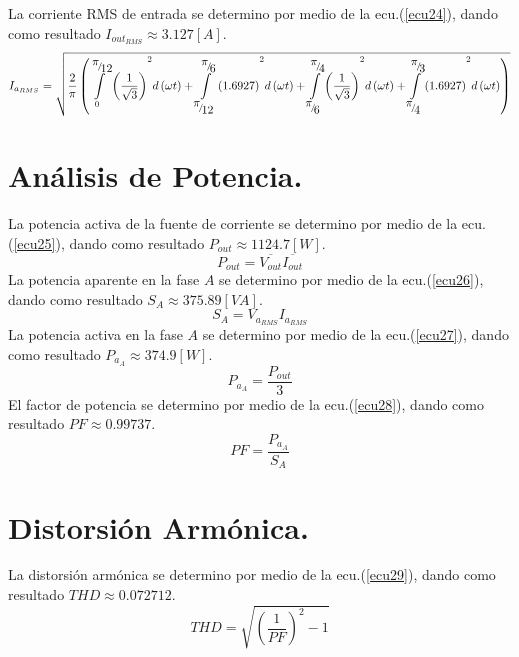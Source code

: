 \documentclass[12pt,graphicx,caption,rotating]{article}
\begin{document}
\noindent
La corriente RMS de entrada se determino por medio de la ecu.(\ref{ecu24}), dando como resultado $I_{out_{RMS}} \approx 3.127 [A] $.
\begin{equation}
 {I_{{a_{RMS}}}} = \sqrt {\frac{2}{\pi }\left( {{{\int\limits_0^{{\raise0.7ex\hbox{$\pi $} \!\mathord{\left/
 {\vphantom {\pi  {12}}}\right.\kern-\nulldelimiterspace}
\!\lower0.7ex\hbox{${12}$}}} {\left( {\frac{1}{{\sqrt 3 }}} \right)} }^2}d\left( {\omega t} \right) + {{\int\limits_{{\raise0.7ex\hbox{$\pi $} \!\mathord{\left/
 {\vphantom {\pi  {12}}}\right.\kern-\nulldelimiterspace}
\!\lower0.7ex\hbox{${12}$}}}^{{\raise0.7ex\hbox{$\pi $} \!\mathord{\left/
 {\vphantom {\pi  6}}\right.\kern-\nulldelimiterspace}
\!\lower0.7ex\hbox{$6$}}} {\left( {1.6927} \right)} }^2}d\left( {\omega t} \right) + {{\int\limits_{{\raise0.7ex\hbox{$\pi $} \!\mathord{\left/
 {\vphantom {\pi  6}}\right.\kern-\nulldelimiterspace}
\!\lower0.7ex\hbox{$6$}}}^{{\raise0.7ex\hbox{$\pi $} \!\mathord{\left/
 {\vphantom {\pi  4}}\right.\kern-\nulldelimiterspace}
\!\lower0.7ex\hbox{$4$}}} {\left( {\frac{1}{{\sqrt 3 }}} \right)} }^2}d\left( {\omega t} \right) + {{\int\limits_{{\raise0.7ex\hbox{$\pi $} \!\mathord{\left/
 {\vphantom {\pi  4}}\right.\kern-\nulldelimiterspace}
\!\lower0.7ex\hbox{$4$}}}^{{\raise0.7ex\hbox{$\pi $} \!\mathord{\left/
 {\vphantom {\pi  3}}\right.\kern-\nulldelimiterspace}
\!\lower0.7ex\hbox{$3$}}} {\left( {1.6927} \right)} }^2}d\left( {\omega t} \right)} \right)}
 \label{ecu24}
\end{equation}

\section{Análisis de Potencia.}
\noindent
La potencia activa de la fuente de corriente se determino por medio de la ecu.(\ref{ecu25}), dando como resultado $P_{out} \approx 1124.7 [W]$.
\begin{equation}
 P_{out} = \overline {{V_{out}}} \overline {{I_{out}}}
 \label{ecu25}
\end{equation}
\noindent
La potencia aparente en la fase $A$ se determino por medio de la ecu.(\ref{ecu26}), dando como resultado $S_A \approx 375.89 [VA]$.
\begin{equation}
 S_A = V_{a_{RMS}} I_{a_{RMS}}
\label{ecu26} 
\end{equation}
\noindent
La potencia activa en la fase $A$ se determino por medio de la ecu.(\ref{ecu27}), dando como resultado $P_{a_A} \approx 374.9 [W]$.
\begin{equation}
 P_{a_A} = \frac{P_{out}}{3}
 \label{ecu27}
\end{equation}
\noindent
El factor de potencia se determino por medio de la ecu.(\ref{ecu28}), dando como resultado $PF \approx 0.99737$.
\begin{equation}
 PF=\frac{P_{a_A}}{S_A}
 \label{ecu28}
\end{equation}

\section{Distorsión Armónica.}
\noindent
La distorsión armónica se determino por medio de la ecu.(\ref{ecu29}), dando como resultado $THD \approx 0.072712$.
\begin{equation}
 THD = \sqrt{\left (\frac{1}{PF}\right )^2 -1}
 \label{ecu29}
\end{equation}
\end{document}
